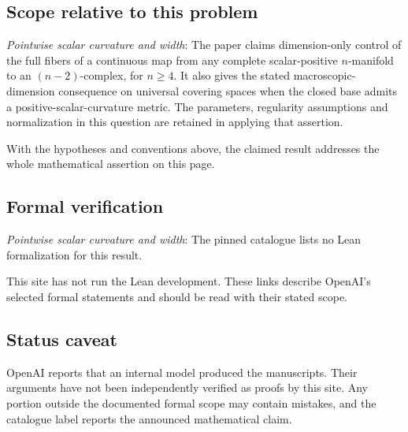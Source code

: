 \documentclass[11pt]{article}
\begin{document}
\subsection{Scope relative to this problem}
\textit{Pointwise scalar curvature and width}: The paper claims dimension-only control of the full fibers of a continuous map from any complete scalar-positive $n$-manifold to an $(n-2)$-complex, for $n\ge4$. It also gives the stated macroscopic-dimension consequence on universal covering spaces when the closed base admits a positive-scalar-curvature metric. The parameters, regularity assumptions and normalization in this question are retained in applying that assertion.

With the hypotheses and conventions above, the claimed result addresses the whole mathematical assertion on this page.

\subsection{Formal verification}
\textit{Pointwise scalar curvature and width}: The pinned catalogue lists no Lean formalization for this result.

This site has not run the Lean development. These links describe OpenAI’s selected formal statements and should be read with their stated scope.

\subsection{Status caveat}
OpenAI reports that an internal model produced the manuscripts. Their arguments have not been independently verified as proofs by this site. Any portion outside the documented formal scope may contain mistakes, and the catalogue label reports the announced mathematical claim.
\end{document}
